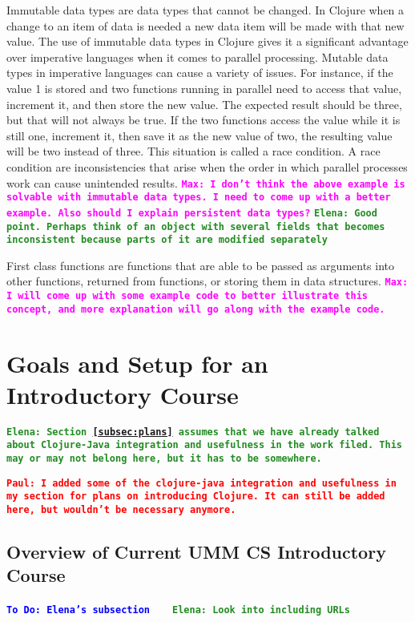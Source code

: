 \documentclass[12pt]{article}
\newcommand{\comment}[1]{{\bf \tt  {#1}}}
\newcommand{\emcomment}[1]{\textcolor{ForestGreen}{\comment{Elena: {#1}}}}
\newcommand{\todo}[1]{\textcolor{blue}{\comment{To Do: {#1}}}}
\newcommand{\pscomment}[1]{\textcolor{red}{\comment{Paul: {#1}}}}
\newcommand{\mmcomment}[1]{\textcolor{magenta}{\comment{Max: {#1}}}}
\begin{document}
Immutable data types are data types that cannot be changed. In Clojure when a change to an item of data is needed a new data item will be made with that new value. The use of immutable data types in Clojure gives it a significant advantage over imperative languages when it comes to parallel processing. Mutable data types in imperative languages can cause a variety of issues. For instance, if the value 1 is stored and two functions running in parallel need to access that value, increment it, and then store the new value. The expected result should be three, but that will not always be true. If the two functions access the value while it is still one, increment it, then save it as the new value of two, the resulting value will be two instead of three. This situation is called a race condition. A race condition are inconsistencies that arise when the order in which parallel processes work can cause unintended results.
\mmcomment{I don't think the above example is solvable with immutable data types. I need to come up with a better example. Also should I explain persistent data types?}
\emcomment{Good point. Perhaps think of an object with several fields that becomes inconsistent because parts of it are modified separately}

First class functions are functions that are able to be passed as arguments into other functions, returned from functions, or storing them in data structures.
\mmcomment{I will come up with some example code to better illustrate this concept, and more explanation will go along with the example code.}   

\section{Goals and Setup for an Introductory Course}\label{sec:racket-clojure}
\emcomment{Section~\ref{subsec:plans} assumes that we have already talked about Clojure-Java integration and usefulness in the work filed. This may or may not belong here, but it has to be somewhere.}

\pscomment{I added some of the clojure-java integration and usefulness in my section for plans on introducing Clojure.  It can still be added here, but wouldn't be necessary anymore.}

\subsection{Overview of Current UMM CS Introductory Course}\label{subsec:course}
\todo{Elena's subsection}
~\cite{htdp}
~\cite{lein} \emcomment{Look into including URLs}
\end{document}
